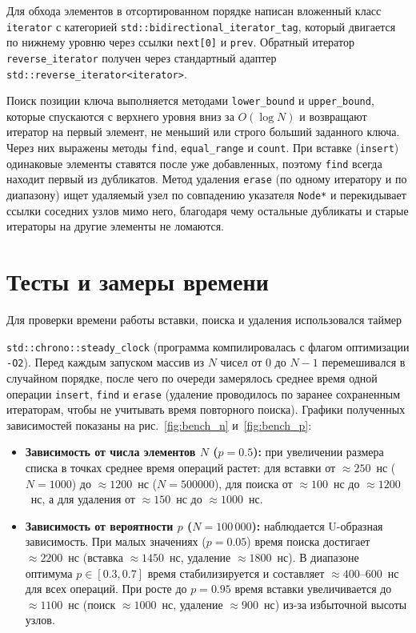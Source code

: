 \documentclass[12 pt, a4paper]{article}%
\begin{document}
Для обхода элементов в отсортированном порядке написан вложенный класс \texttt{iterator} с категорией \texttt{std::bidirectional\_iterator\_tag}, который двигается по нижнему уровню через ссылки \texttt{next[0]} и \texttt{prev}. Обратный итератор \texttt{reverse\_iterator} получен через стандартный адаптер \texttt{std::reverse\_iterator<iterator>}.

Поиск позиции ключа выполняется методами \texttt{lower\_bound} и \texttt{upper\_bound}, которые спускаются с верхнего уровня вниз за $O(\log N)$ и возвращают итератор на первый элемент, не меньший или строго больший заданного ключа. Через них выражены методы \texttt{find}, \texttt{equal\_range} и \texttt{count}. При вставке (\texttt{insert}) одинаковые элементы ставятся после уже добавленных, поэтому \texttt{find} всегда находит первый из дубликатов. Метод удаления \texttt{erase} (по одному итератору и по диапазону) ищет удаляемый узел по совпадению указателя \texttt{Node*} и перекидывает ссылки соседних узлов мимо него, благодаря чему остальные дубликаты и старые итераторы на другие элементы не ломаются.

	\section{Тесты и замеры времени}

Для проверки времени работы вставки, поиска и удаления использовался таймер

\texttt{std::chrono::steady\_clock} (программа компилировалась с флагом оптимизации \texttt{-O2}). Перед каждым запуском массив из $N$ чисел от $0$ до $N-1$ перемешивался в случайном порядке, после чего по очереди замерялось среднее время одной операции \texttt{insert}, \texttt{find} и \texttt{erase} (удаление проводилось по заранее сохраненным итераторам, чтобы не учитывать время повторного поиска). Графики полученных зависимостей показаны на рис.~\ref{fig:bench_n} и~\ref{fig:bench_p}:
\begin{itemize}
    \item \textbf{Зависимость от числа элементов $N$ ($p = 0.5$):} при увеличении размера списка в точках среднее время операций растет: для вставки от $\approx 250$~нс ($N = 1000$) до $\approx 1200$~нс ($N = 500000$), для поиска от $\approx 100$~нс до $\approx 1200$~нс, а для удаления от $\approx 150$~нс до $\approx 1000$~нс.
    \item \textbf{Зависимость от вероятности $p$ ($N = 100\,000$):} наблюдается U-образная зависимость. При малых значениях ($p = 0.05$) время поиска достигает $\approx 2200$~нс (вставка $\approx 1450$~нс, удаление $\approx 1800$~нс). В диапазоне оптимума $p \in [0.3, 0.7]$ время стабилизируется и составляет $\approx 400$--$600$~нс для всех операций. При росте до $p = 0.95$ время вставки увеличивается до $\approx 1100$~нс (поиск $\approx 1000$~нс, удаление $\approx 900$~нс) из-за избыточной высоты узлов.
\end{itemize}
\end{document}
